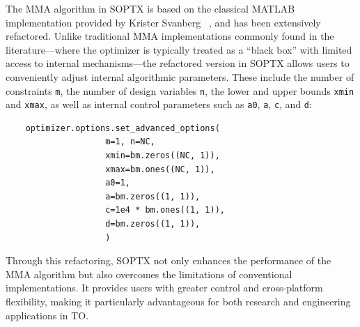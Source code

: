 \documentclass[mathpazo]{cicp}
\begin{document}
The MMA algorithm in SOPTX is based on the classical MATLAB implementation provided by Krister Svanberg ~\cite{Svanberg2007MmaAG}, and has been extensively refactored. Unlike traditional MMA implementations commonly found in the literature—where the optimizer is typically treated as a “black box” with limited access to internal mechanisms—the refactored version in SOPTX allows users to conveniently adjust internal algorithmic parameters. These include the number of constraints \texttt{m}, the number of design variables \texttt{n}, the lower and upper bounds \texttt{xmin} and \texttt{xmax}, as well as internal control parameters such as \texttt{a0}, \texttt{a}, \texttt{c}, and \texttt{d}:
\begin{lstlisting}
	optimizer.options.set_advanced_options(
					m=1, n=NC,
					xmin=bm.zeros((NC, 1)),
					xmax=bm.ones((NC, 1)),
					a0=1,
					a=bm.zeros((1, 1)),
					c=1e4 * bm.ones((1, 1)),
					d=bm.zeros((1, 1)),
					)
\end{lstlisting}

Through this refactoring, SOPTX not only enhances the performance of the MMA algorithm but also overcomes the limitations of conventional implementations. It provides users with greater control and cross-platform flexibility, making it particularly advantageous for both research and engineering applications in TO.
\end{document}
